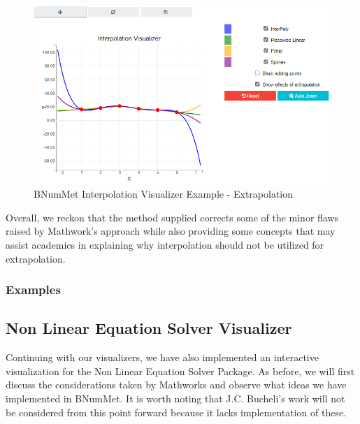 \begin{figure}[H]
    \centering
    \includegraphics[width=\textwidth]{Include/Images/Thesis/Development/Visualizers/INTERPOLATION VISUALIZER/BNumMet.Interpolation.Ex1.2.png}
    \caption{BNumMet Interpolation Visualizer Example - Extrapolation}
    \label{fig:BNumMet Interpolation Visualizer Example - Extrapolation}
\end{figure}

Overall, we reckon that the method supplied corrects some of the minor flaws raised by Mathwork's approach while also providing some concepts that may assist academics in explaining why interpolation should not be utilized for extrapolation. 
\subsubsection{Examples}
	

\subsection{Non Linear Equation Solver Visualizer}
Continuing with our visualizers, we have also implemented an interactive visualization for the Non Linear Equation Solver Package. As before, we will first discuss the considerations taken by Mathworks and observe what ideas we have implemented in BNumMet. It is worth noting that J.C. Bucheli's work will not be considered from this point forward because it lacks implementation of these.

